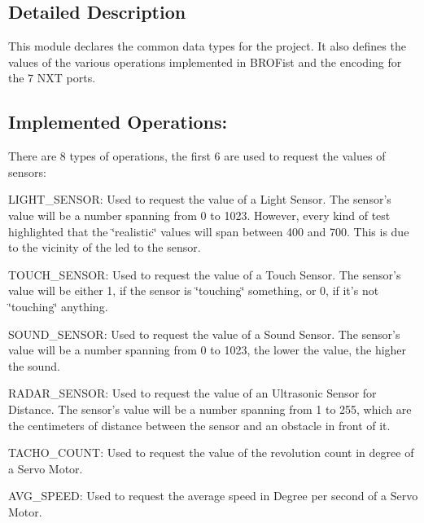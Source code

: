 \subsection{Detailed Description}
This module declares the common data types for the project. It also defines the values of the various operations implemented in BROFist and the encoding for the 7 NXT ports.\hypertarget{group___bro_fist_BroOperations}{}\subsection{Implemented Operations:}\label{group___bro_fist_BroOperations}
There are 8 types of operations, the first 6 are used to request the values of sensors:
\begin{DoxyItemize}
\item {\ttfamily LIGHT\_\-SENSOR:} Used to request the value of a Light Sensor. The sensor's value will be a number spanning from 0 to 1023. However, every kind of test highlighted that the \char`\"{}realistic\char`\"{} values will span between 400 and 700. This is due to the vicinity of the led to the sensor.
\item {\ttfamily TOUCH\_\-SENSOR:} Used to request the value of a Touch Sensor. The sensor's value will be either 1, if the sensor is \char`\"{}touching\char`\"{} something, or 0, if it's not \char`\"{}touching\char`\"{} anything.
\item {\ttfamily SOUND\_\-SENSOR:} Used to request the value of a Sound Sensor. The sensor's value will be a number spanning from 0 to 1023, the lower the value, the higher the sound.
\item {\ttfamily RADAR\_\-SENSOR:} Used to request the value of an Ultrasonic Sensor for Distance. The sensor's value will be a number spanning from 1 to 255, which are the centimeters of distance between the sensor and an obstacle in front of it.
\item {\ttfamily TACHO\_\-COUNT:} Used to request the value of the revolution count in degree of a Servo Motor.
\item {\ttfamily AVG\_\-SPEED:} Used to request the average speed in Degree per second of a Servo Motor.
\end{DoxyItemize}

